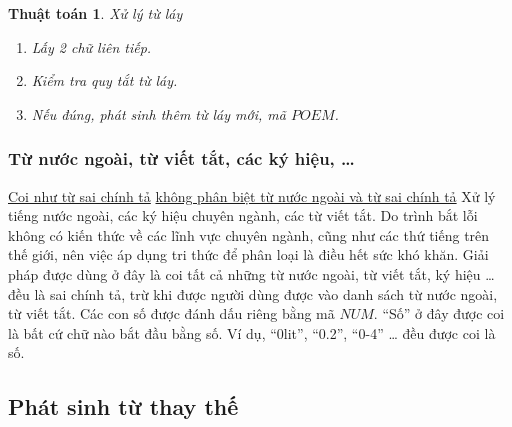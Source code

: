 \documentclass[a4paper,oneside]{book} %
\newcommand{\note}[1]{\underline{#1}}
\newtheorem{algo}{Thuật toán}
\begin{document}
\begin{algo} Xử lý từ láy

\label{algo:poem}
  \begin{enumerate}
  \item Lấy 2 chữ liên tiếp.
  \item Kiểm tra quy tắt từ láy.
  \item Nếu đúng, phát sinh thêm từ láy mới, mã $POEM$.
  \end{enumerate}
\end{algo}


\subsubsection{Từ nước ngoài, từ viết tắt, các ký hiệu, \ldots}

\note{Coi như từ sai chính tả}
\note{không phân biệt từ nước ngoài và từ sai chính tả}
Xử lý tiếng nước ngoài, các ký hiệu chuyên ngành, các từ viết tắt. Do
trình bắt lỗi không có kiến thức về các lĩnh vực chuyên 
ngành, cũng như các thứ tiếng trên thế giới, nên việc áp dụng tri thức
để phân loại là điều hết sức khó khăn. Giải pháp được dùng ở đây là
coi tất cả những từ nước ngoài, từ viết tắt, ký hiệu \ldots đều là sai
chính tả, trừ khi được người dùng được vào danh sách từ nước ngoài, từ
viết tắt. Các con số được đánh dấu riêng bằng mã $NUM$.
``Số'' ở đây được coi là bất cứ chữ nào bắt đầu bằng số. Ví dụ, ``0lit'',
``0.2'', ``0-4'' \ldots{} đều được coi là số. 

\subsection{Phát sinh từ thay thế}
\end{document}
